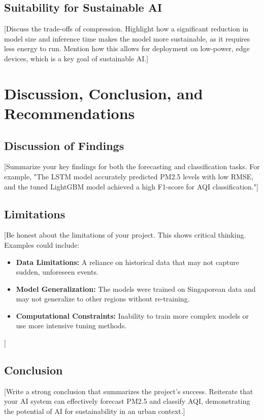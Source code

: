 \documentclass[11pt, a4paper]{article}
\begin{document}
\subsection{Suitability for Sustainable AI}
[Discuss the trade-offs of compression. Highlight how a significant reduction in model size and inference time makes the model more sustainable, as it requires less energy to run. Mention how this allows for deployment on low-power, edge devices, which is a key goal of sustainable AI.]

\section{Discussion, Conclusion, and Recommendations}

\subsection{Discussion of Findings}
[Summarize your key findings for both the forecasting and classification tasks. For example, "The LSTM model accurately predicted PM2.5 levels with low RMSE, and the tuned LightGBM model achieved a high F1-score for AQI classification."]

\subsection{Limitations}
[Be honest about the limitations of your project. This shows critical thinking. Examples could include:
\begin{itemize}
    \item \textbf{Data Limitations:} A reliance on historical data that may not capture sudden, unforeseen events.
    \item \textbf{Model Generalization:} The models were trained on Singaporean data and may not generalize to other regions without re-training.
    \item \textbf{Computational Constraints:} Inability to train more complex models or use more intensive tuning methods.
\end{itemize}]

\subsection{Conclusion}
[Write a strong conclusion that summarizes the project's success. Reiterate that your AI system can effectively forecast PM2.5 and classify AQI, demonstrating the potential of AI for sustainability in an urban context.]
\end{document}
